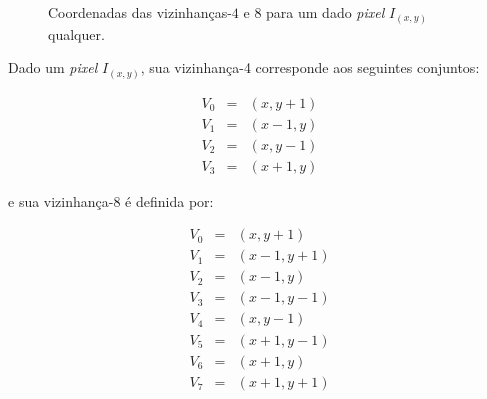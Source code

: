 \begin{figure}[ht!]
\begin{center}
      \caption{Coordenadas das vizinhanças-$4$ e $8$ para um dado \textit{pixel}
        $I_{(x,y)}$ qualquer.}
        \label{fig:vizinhanca}

\hspace{2pc}
\fonteminha
\end{center}
\end{figure}

Dado um \textit{pixel} $I_{(x,y)}$,
sua vizinhança-4 corresponde aos seguintes conjuntos:

\begin{eqnarray}
  V_0 & = & (x, y+1) \\
  V_1 & = & (x-1, y) \\
  V_2 & = & (x, y-1) \\
  V_3 & = & (x+1, y)
\end{eqnarray}

\noindent e sua vizinhança-8 é definida por:

\begin{eqnarray}
  V_0 & = & (x, y+1) \\
  V_1 & = & (x-1, y+1) \\
  V_2 & = & (x-1, y) \\
  V_3 & = & (x-1, y-1) \\
  V_4 & = & (x, y-1) \\
  V_5 & = & (x+1, y-1) \\
  V_6 & = & (x+1, y) \\
  V_7 & = & (x+1, y+1)
\end{eqnarray}


